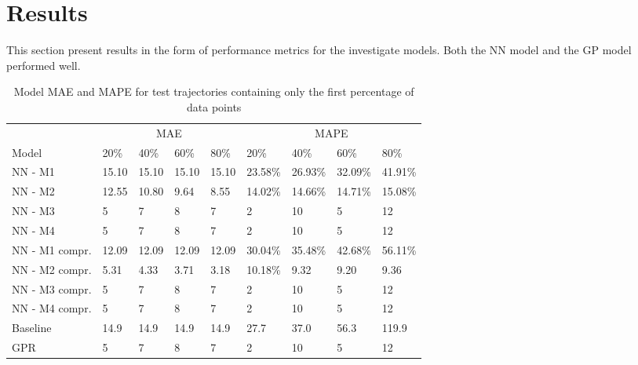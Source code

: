 
\captionsetup{width=.75\textwidth}


\chapter{Results}
\label{cha:results}
This section present results in the form of performance metrics for the investigate models. Both the NN model and the GP model performed well.
\begin{table}[H]
  \centering
  \caption{Model MAE and MAPE for test trajectories containing only the first percentage of data points}
  \label{tbl:models-mae-and-mape}
  \begin{tabular}{l | l | l | l | l || l | l | l | l }
    & \multicolumn{4}{c}{MAE} & \multicolumn{4}{c}{MAPE} \\
    Model      & 20\% & 40\% & 60\% & 80\% & 20\% & 40\% & 60\% & 80\% \\
    \hline
    NN - M1        & 15.10 &  15.10 & 15.10 &  15.10  & 23.58\% & 26.93\% & 32.09\% & 41.91\% \\
    NN - M2        & 12.55 &  10.80 & 9.64 &  8.55  & 14.02\% & 14.66\% & 14.71\% & 15.08\% \\
    NN - M3        & 5 &  7 & 8 &  7  & 2 & 10 & 5 & 12 \\
    NN - M4        & 5 &  7 & 8 &  7  & 2 & 10 & 5 & 12 \\
    NN - M1 compr.        & 12.09 &  12.09 & 12.09 &  12.09  & 30.04\% & 35.48\% & 42.68\% & 56.11\% \\
    NN - M2 compr.       & 5.31 &  4.33 & 3.71 &  3.18  & 10.18\% & 9.32 & 9.20 & 9.36 \\
    NN - M3 compr.       & 5 &  7 & 8 &  7  & 2 & 10 & 5 & 12 \\
    NN - M4 compr.       & 5 &  7 & 8 &  7  & 2 & 10 & 5 & 12 \\
    Baseline & 14.9 & 14.9 & 14.9 & 14.9  & 27.7 & 37.0 & 56.3 & 119.9 \\
    GPR        & 5 &  7 & 8 &  7  & 2 & 10 & 5 & 12 \\
  \end{tabular}
\end{table}

